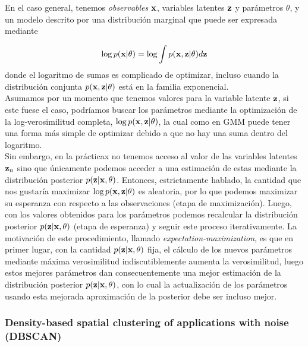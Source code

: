  \begin{mdframed}[style=pendiente, frametitle={\center Expectation-maximization}]

En el caso general, tenemos \emph{observables} $\mathbf{x}$, variables latentes $\mathbf{z}$ y parámetros $\theta$, y un modelo descrito por una distribución marginal que puede ser expresada mediante 

\begin{equation}
	\log p(\mathbf{x}|\theta) = \log \int p(\mathbf{x},\mathbf{z}|\theta)d\mathbf{z}
\end{equation}
donde el logaritmo de sumas es complicado de optimizar, incluso cuando la distribución conjunta $p(\mathbf{x},\mathbf{z}|\theta)$ está en la familia exponencial.\\

Asumamos por un momento que tenemos valores para la variable latente $\mathbf{z}$, si este fuese el caso, podríamos buscar los parámetros mediante la optimización de la log-verosimilitud completa, $\log p(\mathbf{x}, \mathbf{z} |\theta)$, la cual como en GMM puede tener una forma más simple de optimizar debido a que no hay una suma dentro del logaritmo. \\

Sin embargo, en la prácticax no tenemos acceso al valor de las variables latentes $\mathbf{z}_n$ sino que únicamente podemos acceder a una estimación de estas mediante la distribución posterior $p(\mathbf{z}|\mathbf{x},	\theta)$. Entonces, estrictamente hablado, la cantidad que nos gustaría maximizar $\log p(\mathbf{x}, \mathbf{z} |\theta)$ es aleatoria, por lo que podemos maximizar su esperanza con respecto a las observaciones (etapa de maximización). Luego, con los valores obtenidos para los parámetros podemos recalcular la distribución posterior $p(\mathbf{z}|\mathbf{x},\theta)$ (etapa de esperanza) y seguir este proceso iterativamente. La motivación de este procedimiento, llamado \emph{expectation-maximization}, es que en primer lugar, con la cantidad $p(\mathbf{z}|\mathbf{x},\theta)$ fija, el cálculo de los nuevos parámetros mediante máxima verosimilitud indiscutiblemente aumenta la verosimilitud, luego estos mejores parámetros dan consecuentemente una mejor estimación de la distribución posterior $p(\mathbf{z}|\mathbf{x},\theta)$, con lo cual la actualización de los parámetros usando esta mejorada aproximación de la posterior debe ser incluso mejor.


\end{mdframed}


\subsubsection{Density-based spatial clustering of applications with noise (DBSCAN)}

